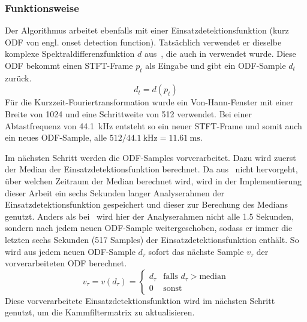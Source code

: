 {{		\subsubsection*{Funktionsweise}
		{
			Der Algorithmus arbeitet ebenfalls mit einer Einsatzdetektionsfunktion (kurz ODF von engl. onset detection function).
			Tatsächlich verwendet er dieselbe komplexe Spektraldifferenzfunktion $d$ aus~\cite{2004_BeDaDuSa},
				die auch in \cite{2009_DaPlSt} verwendet wurde.
			Diese ODF bekommt einen STFT-Frame $p_t$ als Eingabe und gibt ein ODF-Sample $d_t$ zurück.
			\begin{equation}
				d_t = d(p_t)
			\end{equation}
			Für die Kurzzeit-Fouriertransformation wurde ein Von-Hann-Fenster mit einer Breite von \num{1024} und eine Schrittweite von \num{512} verwendet.
			Bei einer Abtastfrequenz von \SI{44.1}{\kilo\hertz} entsteht so ein neuer STFT-Frame
				und somit auch ein neues ODF-Sample,
				alle $512 / \SI{44.1}{\kilo\hertz} = \SI{11.61}{\milli\second}$.

			Im nächsten Schritt werden die ODF-Samples vorverarbeitet.
			Dazu wird zuerst der Median der Einsatzdetektionsfunktion berechnet.
			Da aus~\cite{2011_PlRoSt} nicht hervorgeht,
				über welchen Zeitraum der Median berechnet wird,
				wird in der Implementierung dieser Arbeit
				ein sechs Sekunden langer Analyserahmen der Einsatzdetektionsfunktion gespeichert
				und dieser zur Berechung des Medians genutzt.
			Anders als bei~\cite{2009_DaPlSt} wird hier der Analyserahmen nicht alle \num{1.5} Sekunden,
				sondern nach jedem neuen ODF-Sample weitergeschoben,
				sodass er immer die letzten sechs Sekunden (\num{517} Samples) der Einsatzdetektionsfunktion enthält.
			So wird aus jedem neuen ODF-Sample $d_\tau$ sofort das nächste Sample $v_\tau$ der vorverarbeiteten ODF berechnet.
			\begin{equation}
				v_\tau = v(d_\tau) =
				\begin{cases}
					d_\tau & \text{falls } d_\tau > \text{median} \\
					0    & \text{sonst}
				\end{cases}
			\end{equation}
			Diese vorverarbeitete Einsatzdetektionsfunktion wird im nächsten Schritt genutzt,
				um die Kammfiltermatrix zu aktualisieren.

}}}
